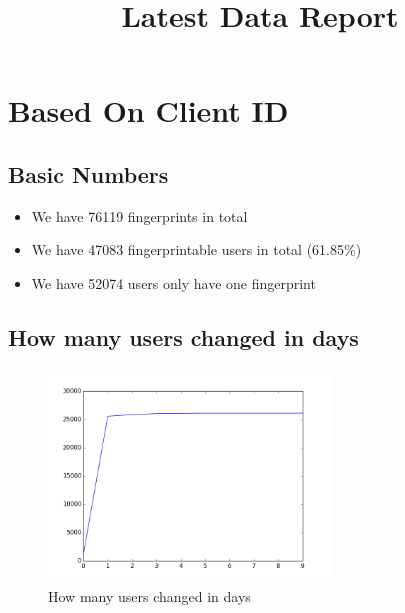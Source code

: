 \documentclass[10pt, conference, compsocconf]{IEEEtran}
\begin{document}
\title{Latest Data Report}
\author{
}
\maketitle
\section{Based On Client ID}
\subsection{Basic Numbers}
\begin{itemize}\item We have 76119 fingerprints in total\item We have 47083 fingerprintable users in total (61.85\%)\item We have 52074 users only have one fingerprint \end{itemize}\subsection{How many users changed in days}
\begin{figure}[H]\centering\includegraphics[width=75mm,scale=0.5]{changebytime}\caption{How many users changed in days}\end{figure}
\end{document}
